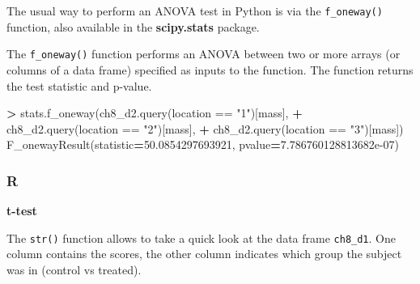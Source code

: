 \documentclass[
]{book}
\newenvironment{Shaded}{\begin{snugshade}}{\end{snugshade}}
\newcommand{\DecValTok}[1]{\textcolor[rgb]{0.00,0.00,0.81}{#1}}
\newcommand{\ErrorTok}[1]{\textcolor[rgb]{0.64,0.00,0.00}{\textbf{#1}}}
\newcommand{\FloatTok}[1]{\textcolor[rgb]{0.00,0.00,0.81}{#1}}
\newcommand{\FunctionTok}[1]{\textcolor[rgb]{0.00,0.00,0.00}{#1}}
\newcommand{\NormalTok}[1]{#1}
\newcommand{\OperatorTok}[1]{\textcolor[rgb]{0.81,0.36,0.00}{\textbf{#1}}}
\newcommand{\SpecialCharTok}[1]{\textcolor[rgb]{0.00,0.00,0.00}{#1}}
\newcommand{\StringTok}[1]{\textcolor[rgb]{0.31,0.60,0.02}{#1}}
\begin{document}
The usual way to perform an ANOVA test in Python is via the \texttt{f\_oneway()} function, also available in the \textbf{scipy.stats} package.

The \texttt{f\_oneway()} function performs an ANOVA between two or more arrays (or columns of a data frame) specified as inputs to the function. The function returns the test statistic and p-value.

\begin{Shaded}
\begin{Highlighting}[]
\OperatorTok{\textgreater{}}\NormalTok{ stats.f\_oneway(ch8\_d2.query(}\StringTok{\textquotesingle{}location == "1"\textquotesingle{}}\NormalTok{)[}\StringTok{\textquotesingle{}mass\textquotesingle{}}\NormalTok{], }
\OperatorTok{+}\NormalTok{                ch8\_d2.query(}\StringTok{\textquotesingle{}location == "2"\textquotesingle{}}\NormalTok{)[}\StringTok{\textquotesingle{}mass\textquotesingle{}}\NormalTok{],}
\OperatorTok{+}\NormalTok{                ch8\_d2.query(}\StringTok{\textquotesingle{}location == "3"\textquotesingle{}}\NormalTok{)[}\StringTok{\textquotesingle{}mass\textquotesingle{}}\NormalTok{])}
\NormalTok{F\_onewayResult(statistic}\OperatorTok{=}\FloatTok{50.0854297693921}\NormalTok{, pvalue}\OperatorTok{=}\FloatTok{7.786760128813682e{-}07}\NormalTok{)}
\end{Highlighting}
\end{Shaded}

\hypertarget{r-44}{%
\subsubsection*{R}\label{r-44}}

\textbf{t-test}

The \texttt{str()} function allows to take a quick look at the data frame \texttt{ch8\_d1}. One column contains the scores, the other column indicates which group the subject was in (control vs treated).

\begin{Shaded}
\end{Shaded}
\end{document}
